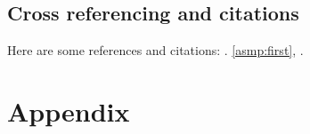 \documentclass[english,counters by chapter]{uniud}
\begin{document}
\section{Cross referencing and citations}

Here are some references and citations: . \cref{asmp:first}, \cite{article,book,booklet,conference,inbook,incollection,manual,mastersthesis,misc,phdthesis,proceedings,techreport,unpublished}.



\printbibliography

\appendix

\chapter{Appendix}
\lipsum[1-7]
\end{document}
